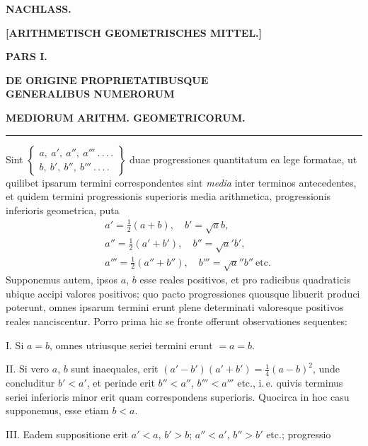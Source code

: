 \clearpage{}
\begin{center}
\textbf{NACHLASS.}\par
\textbf{[ARITHMETISCH GEOMETRISCHES MITTEL.]}\par
\textbf{PARS I.}\par
\textbf{DE ORIGINE PROPRIETATIBUSQUE}\\\textbf{GENERALIBUS NUMERORUM}\par
\textbf{MEDIORUM ARITHM. GEOMETRICORUM.}\par
\rule{0.09\linewidth}{0.4pt}\par
\end{center}
Sint $\left\{\begin{array}{l}a,\allowbreak \ a',\allowbreak \ a'',\allowbreak \ a'''\ .\,\allowbreak .\,\allowbreak .\,\allowbreak .\\ b,\allowbreak \ b',\allowbreak \ b'',\allowbreak \ b'''\ .\,\allowbreak .\,\allowbreak .\,\allowbreak .\end{array}\right\}$ duae progressiones quantitatum ea lege formatae, ut
quilibet ipsarum termini correspondentes sint \textit{media} inter terminos antecedentes,
et quidem termini progressionis superioris media arithmetica, progressionis inferioris geometrica, puta
\[
\begin{aligned}&a'=\tfrac12(a+b),\quad b'=\surd ab,\\[6pt]&a''=\tfrac12(a'+b'),\quad b''=\surd a'b',\\[6pt]&a'''=\tfrac12(a''+b''),\quad b'''=\surd a''b''\ \mathrm{etc.}\end{aligned}
\]
Supponemus autem, ipsos $a$, $b$ esse reales positivos, et pro radicibus quadraticis
ubique accipi valores positivos; quo pacto progressiones quousque libuerit produci
poterunt, omnes ipsarum termini erunt plene determinati valoresque positivos reales nanciscentur. Porro prima hic se fronte offerunt observationes sequentes:
\par
I. Si $a=b$, omnes utriusque seriei termini erunt $=a=b$.
\par
II. Si vero $a$, $b$ sunt inaequales, erit $(a'-b')(a'+b')=\tfrac14(a-b)^2$, unde
concluditur $b'<a'$, et perinde erit $b''<a''$, $b'''<a'''$ etc., i.\,e. quivis terminus seriei inferioris minor erit quam correspondens superioris. Quocirca in hoc casu
supponemus, esse etiam $b<a$.
\par
III. Eadem suppositione erit $a'<a$, $b'>b$; $a''<a'$, $b''>b'$ etc.; progressio
